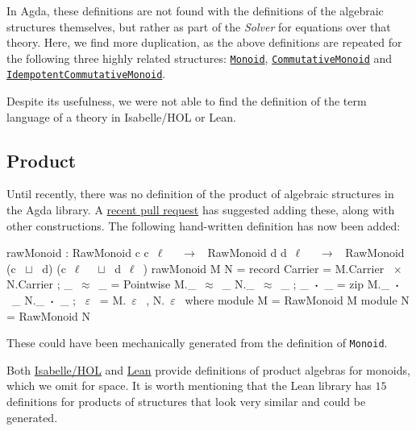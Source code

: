 In Agda, these definitions are not found with the definitions of the
algebraic structures themselves, but rather as part of the
\emph{Solver} for equations over that theory. Here, we find more
duplication, as the above definitions
are repeated for the following three highly related structures: 
\href{https://github.com/agda/agda-stdlib/blob/4a8d8f5ffbdbd967ca1bb708895ea63709e0063d/src/Algebra/Solver/Monoid.agda}
{\lstinline|Monoid|},
\href{https://github.com/agda/agda-stdlib/blob/4a8d8f5ffbdbd967ca1bb708895ea63709e0063d/src/Algebra/Solver/CommutativeMonoid.agda}
{\lstinline|CommutativeMonoid|}
and 
\href{https://github.com/agda/agda-stdlib/blob/4a8d8f5ffbdbd967ca1bb708895ea63709e0063d/src/Algebra/Solver/IdempotentCommutativeMonoid.agda}
{\lstinline|IdempotentCommutativeMonoid|}.

Despite its usefulness, we were not able to find the definition of the term
language of a theory in Isabelle/HOL or Lean.  

\subsection{Product}
Until recently, there was no definition of the product of algebraic
structures in the Agda library.  A 
\href{https://github.com/agda/agda-stdlib/pull/1109}{recent pull request}
has suggested adding these, along with other constructions.  The
following hand-written definition has now been added:
\begin{agdacode}
rawMonoid : RawMonoid c c~$\ell$~ ~$\to$~ RawMonoid d d~$\ell$~ ~$\to$~ 
RawMonoid (c ~$\sqcup$~ d) (c~$\ell$~ ~$\sqcup$~ d~$\ell$~)
rawMonoid M N = record
{ Carrier = M.Carrier ~$\times$~ N.Carrier
; _~$\approx$~_ = Pointwise M._~$\approx$~_ N._~$\approx$~_
; _~$\boldsymbol{\cdot}$~_ = zip M._~$\boldsymbol{\cdot}$~_ N._~$\boldsymbol{\cdot}$~_
; ~$\varepsilon$~ = M.~$\varepsilon$~ , N.~$\varepsilon$~
}
where
module M = RawMonoid M
module N = RawMonoid N
\end{agdacode}

These could have been mechanically generated from the definition
of \verb|Monoid|.

Both 
\href{https://isabelle.in.tum.de/website-Isabelle2019/dist/library/HOL/HOL-Algebra/Group.html}
{Isabelle/HOL}
and 
\href{https://github.com/leanprover-community/mathlib/blob/3c58f160fd51ebf989138ed7c8981f821f08f860/src/algebra/pi_instances.lean}
{Lean}
provide definitions of product algebras for monoids, which we omit for space.
It is worth mentioning that the Lean library has $15$ definitions for products
of structures that look very similar and could be generated. 


